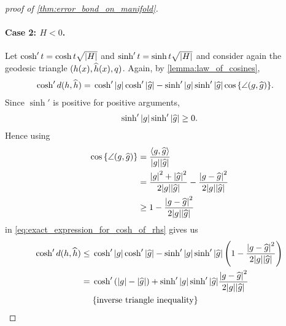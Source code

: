 \documentclass[english, a4paper, 12pt]{article}
\newcommand\bodgeip[2]{\langle #1, #2 \rangle} %
\begin{document}
\begin{proof}[proof of \cref{thm:error_bond_on_manifold}]
	\paragraph{Case 2: $H < 0$.}
	Let $\cosh'{t} = \cosh{t \sqrt{\abs{H}}}$ and $\sinh'{t} = \sinh{t \sqrt{\abs{H}}}$ and consider again the geodesic triangle $(h(x), \widehat{h}(x), q)$.
	Again, by \cref{lemma:law_of_cosines},
	\begin{align}
		\cosh'{d(h, \mathhat{h})} ={}&
		\cosh'{\abs{g}} \cosh'{\abs{\mathhat{g}}} - \sinh'{\abs{g}} \sinh'{\abs{\mathhat{g}}} \cos{\left\{ \angle(g, \mathhat{g}) \right\}}.%
		\label{eq:exact_expression_for_cosh_of_rhs}
	\end{align}
	Since $\sinh'{}$ is positive for positive arguments,
	\begin{align}
		\sinh'{\abs{g}} \sinh'{\abs{\widehat{g}}} \geq 0.
	\end{align}
	Hence using
	\begin{align}
		\cos{\left\{ \angle(g, \mathhat{g}) \right\}} ={}& \frac{\bodgeip{g}{\mathhat{g}}}{\abs{g} \abs{\mathhat{g}}}\\
		={}& \frac{\abs{g}^2 + \abs{\mathhat{g}}^2}{2 \abs{g} \abs{\mathhat{g}}} - \frac{\abs{g - \mathhat{g}}^2}{2 \abs{g} \abs{\mathhat{g}}}\\
		\geq{}& 1 - \frac{\abs{g - \mathhat{g}}^2}{2 \abs{g} \abs{\mathhat{g}}}%
		\label{eq:bound_for_cos}
	\end{align}
	in \cref{eq:exact_expression_for_cosh_of_rhs} gives us
	\begin{align}
		\cosh'{d(h, \mathhat{h})} \leq{}&
		\cosh'{\abs{g}} \cosh'{\abs{\mathhat{g}}} - \sinh'{\abs{g}} \sinh'{\abs{\mathhat{g}}} \left( 1 - \frac{\abs{g - \mathhat{g}}^2}{2 \abs{g} \abs{\mathhat{g}}} \right) \\
		={}& \cosh'{(\abs{g} - \abs{\mathhat{g}})} + \sinh'{\abs{g}} \sinh'{\abs{\mathhat{g}}} \frac{\abs{g - \mathhat{g}}^2}{2 \abs{g} \abs{\mathhat{g}}}\\
		&\{\textrm{inverse triangle inequality}\}\nonumber\\

\end{align}
\end{proof}
\end{document}
